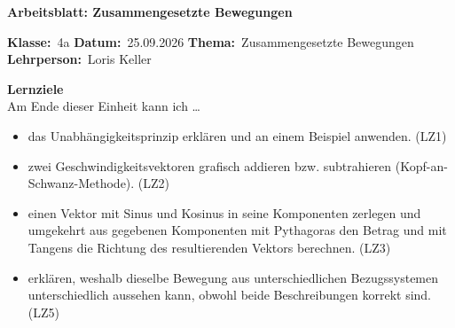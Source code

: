 \documentclass[addpoints,11pt,a4paper]{exam}
\newcommand{\Kopfzeile}[4]{%
  \begin{titlebox}
    {\color{white}\sffamily\bfseries\Large #4}
  \end{titlebox}
  \vspace{0.5em}
  \noindent\textbf{Klasse:}~#1 \hfill \textbf{Datum:}~#2 \hfill \textbf{Thema:}~#3
    \hfill \textbf{Lehrperson:}~Loris Keller
  \vspace{0.8em}
  \lhead{\textcolor{darkgray}{#3}}
  \rhead{\textcolor{darkgray}{#4}}
}
\newcommand{\Klasse}{4a}
\newcommand{\Datum}{25.09.2026}
\newcommand{\Thema}{Zusammengesetzte Bewegungen}
\newcommand{\ArbeitsblattTitel}{Arbeitsblatt: Zusammengesetzte Bewegungen}
\begin{document}
\Kopfzeile{\Klasse}{\Datum}{\Thema}{\ArbeitsblattTitel}

\begin{infobox}
\textbf{Lernziele}\\
Am Ende dieser Einheit kann ich \dots
\begin{itemize}[leftmargin=1.2cm,itemsep=0.25em]
  \item das Unabhängigkeitsprinzip erklären und an einem Beispiel anwenden. (LZ1)
  \item zwei Geschwindigkeitsvektoren grafisch addieren bzw. subtrahieren (Kopf-an-Schwanz-Methode). (LZ2)
  \item einen Vektor mit Sinus und Kosinus in seine Komponenten zerlegen und umgekehrt aus gegebenen Komponenten mit Pythagoras den Betrag und mit Tangens die Richtung des resultierenden Vektors berechnen. (LZ3)
  \item erklären, weshalb dieselbe Bewegung aus unterschiedlichen Bezugssystemen unterschiedlich aussehen kann, obwohl beide Beschreibungen korrekt sind. (LZ5)
\end{itemize}
\end{infobox}
\end{document}
